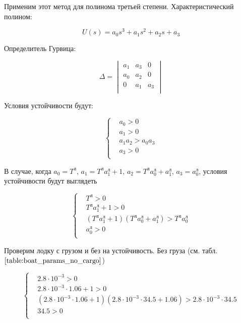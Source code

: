 \documentclass[12pt,a4paper]{article}
\begin{document}
Применим этот метод для полинома третьей степени. Характеристический полином:

$$ U(s) = a_0s^3 + a_1s^2 + a_2s + a_3 $$

Определитель Гурвица:

\begin{equation*}
	\Delta = 
	\begin{vmatrix}
		a_1 & a_3 & 0 \\
		a_0 & a_2 & 0 \\
		0 & a_1 & a_3 \\
	\end{vmatrix}
\end{equation*}

Условия устойчивости будут:

\begin{equation*}
	\begin{cases}
		&a_0 > 0 \\
		&a_1 > 0 \\
		&a_1a_2 > a_0a_3 \\
		&a_3 > 0 \\
	\end{cases}
\end{equation*}

В случае, когда $a_0 = T^\text{л}$, $a_1 = T^\text{л} a_1^\text{л} + 1$, $a_2 = T^\text{л} a_0^\text{л} + a_1^\text{л}$, $a_3 = a_0^\text{л}$, условия устойчивости будут выглядеть

\begin{equation*}
	\begin{cases}
		&T^\text{л} > 0 \\
		&T^\text{л}a_1^\text{л} + 1 > 0 \\
		&(T^\text{л}a_1^\text{л} + 1)(T^\text{л}a_0^\text{л} + a_1^\text{л}) > T^\text{л}a_0^\text{л} \\
		&a_0^\text{л} > 0 \\
	\end{cases}
\end{equation*}

Проверим лодку с грузом и без на устойчивость. Без груза (см. табл. $\ref{table:boat_params_no_cargo}$)

\begin{equation*}
	\begin{cases}
		&2.8 \cdot 10^{-3} > 0 \\
		&2.8 \cdot 10^{-3} \cdot 1.06 + 1 > 0 \\
		& (2.8 \cdot 10^{-3} \cdot 1.06 + 1)(2.8 \cdot 10^{-3} \cdot 34.5 + 1.06) > 2.8 \cdot 10^{-3} \cdot 34.5 \\
		&34.5 > 0 \\
	\end{cases}
\end{equation*}
\end{document}
